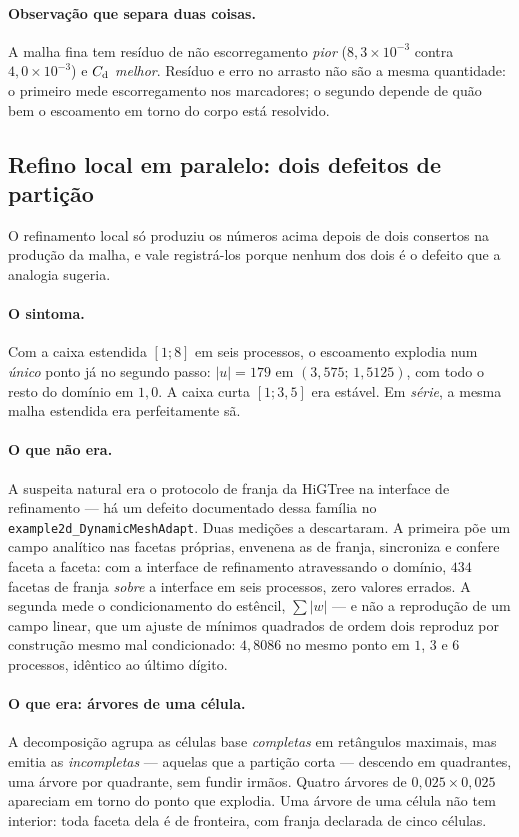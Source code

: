 \paragraph{Observação que separa duas coisas.} A malha fina tem resíduo de não
escorregamento \emph{pior} ($8{,}3\times10^{-3}$ contra $4{,}0\times10^{-3}$) e
$C_{\mathrm{d}}$ \emph{melhor}. Resíduo e erro no arrasto não são a mesma quantidade: o
primeiro mede escorregamento nos marcadores; o segundo depende de quão bem o
escoamento em torno do corpo está resolvido.

\subsection{Refino local em paralelo: dois defeitos de partição}

O refinamento local só produziu os números acima depois de dois consertos na
produção da malha, e vale registrá-los porque nenhum dos dois é o defeito que a
analogia sugeria.

\paragraph{O sintoma.} Com a caixa estendida $[1;8]$ em seis processos, o
escoamento explodia num \emph{único} ponto já no segundo passo: $|u| = 179$ em
$(3{,}575;\,1{,}5125)$, com todo o resto do domínio em $1{,}0$. A caixa curta
$[1;3{,}5]$ era estável. Em \emph{série}, a mesma malha estendida era
perfeitamente sã.

\paragraph{O que não era.} A suspeita natural era o protocolo de franja da
HiGTree na interface de refinamento --- há um defeito documentado dessa família
no \texttt{example2d\_DynamicMeshAdapt}. Duas medições a descartaram. A primeira
põe um campo analítico nas facetas próprias, envenena as de franja, sincroniza e
confere faceta a faceta: com a interface de refinamento atravessando o domínio,
$434$ facetas de franja \emph{sobre} a interface em seis processos, zero valores
errados. A segunda mede o condicionamento do estêncil, $\sum|w|$ --- e não a
reprodução de um campo linear, que um ajuste de mínimos quadrados de ordem dois
reproduz por construção mesmo mal condicionado: $4{,}8086$ no mesmo ponto em
$1$, $3$ e $6$ processos, idêntico ao último dígito.

\paragraph{O que era: árvores de uma célula.} A decomposição agrupa as células
base \emph{completas} em retângulos maximais, mas emitia as \emph{incompletas}
--- aquelas que a partição corta --- descendo em quadrantes, uma árvore por
quadrante, sem fundir irmãos. Quatro árvores de $0{,}025 \times 0{,}025$
apareciam em torno do ponto que explodia. Uma árvore de uma célula não tem
interior: toda faceta dela é de fronteira, com franja declarada de cinco
células.


